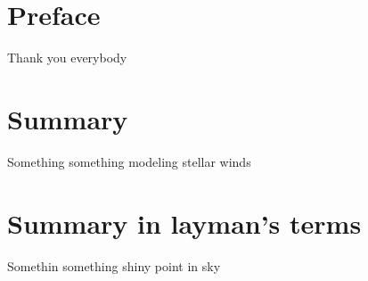 \chapter*{Preface}
Thank you everybody
\chapter*{Summary}
Something something modeling stellar winds
\chapter*{Summary in layman's terms}
Somethin something shiny point in sky